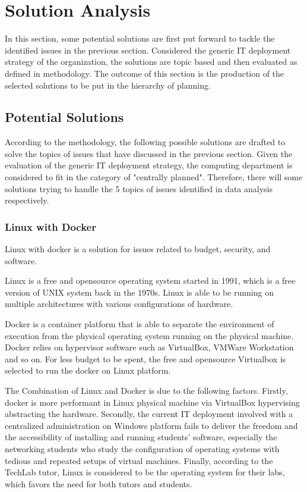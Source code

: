 
\section{Solution Analysis}

In this section, some potential solutions are first put forward to tackle the identified issues in the previous section. Considered the generic IT deployment strategy of the organization, the solutions are topic based and then evaluated as defined in methodology. The outcome of this section is the production of the selected solutions to be put in the hierarchy of planning.

\subsection{Potential Solutions}

According to the methodology, the following possible solutions are drafted to solve the topics of issues that have discussed in the previous section. Given the evaluation of the generic IT deployment strategy, the computing department is considered to fit in the category of "centrally planned". Therefore, there will some solutions trying to handle the 5 topics of issues identified in data analysis respectively.

\subsubsection{Linux with Docker}
Linux with docker is a solution for issues related to budget, security, and software.

Linux is a free and opensource operating system started in 1991, which is a free version of UNIX system back in the 1970s. Linux is able to be running on multiple architectures with various configurations of hardware.

Docker is a container platform that is able to separate the environment of execution from the physical operating system running on the physical machine. Docker relies on hypervisor software such as VirtualBox, VMWare Workstation and so on. For less budget to be spent, the free and opensource Virtualbox is selected to run the docker on Linux platform.

The Combination of Linux and Docker is due to the following factors. Firstly, docker is more performant in Linux physical machine via VirtualBox hypervising abstracting the hardware. Secondly, the current IT deployment involved with a centralized administration on Windows platform fails to deliver the freedom and the accessibility of installing and running students' software, especially the networking students who study the configuration of operating systems with tedious and repeated setups of virtual machines. Finally, according to the TechLab tutor, Linux is considered to be the operating system for their labs, which favors the need for both tutors and students.

